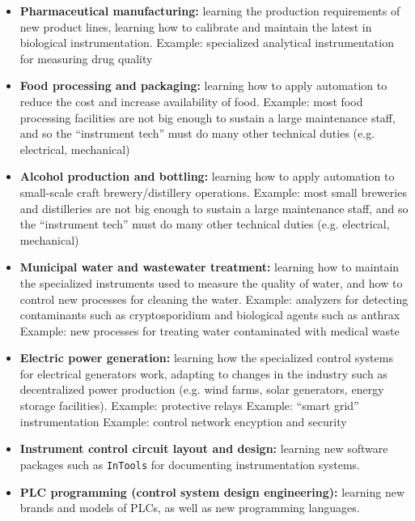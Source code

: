 \begin{itemize}
\itemitem{} Example: pulp consistency control, which is unique to this industry
\itemitem{} Example: ``hog fuel'' boiler controls, challenging due to the inconsist nature of wood waste (``hog'') fuel
\itemitem{} Example: recovery boiler operations (very dangerous processes, known for their history of explosive failure)
\item{} {\bf Pharmaceutical manufacturing:} learning the production requirements of new product lines, learning how to calibrate and maintain the latest in biological instrumentation.  
\itemitem{} Example: specialized analytical instrumentation for measuring drug quality
\item{} {\bf Food processing and packaging:} learning how to apply automation to reduce the cost and increase availability of food.
\itemitem{} Example: most food processing facilities are not big enough to sustain a large maintenance staff, and so the ``instrument tech'' must do many other technical duties (e.g. electrical, mechanical)
\item{} {\bf Alcohol production and bottling:} learning how to apply automation to small-scale craft brewery/distillery operations.
\itemitem{} Example: most small breweries and distilleries are not big enough to sustain a large maintenance staff, and so the ``instrument tech'' must do many other technical duties (e.g. electrical, mechanical)
\item{} {\bf Municipal water and wastewater treatment:} learning how to maintain the specialized instruments used to measure the quality of water, and how to control new processes for cleaning the water.
\itemitem{} Example: analyzers for detecting contaminants such as cryptosporidium and biological agents such as anthrax
\itemitem{} Example: new processes for treating water contaminated with medical waste
\item{} {\bf Electric power generation:} learning how the specialized control systems for electrical generators work, adapting to changes in the industry such as decentralized power production (e.g. wind farms, solar generators, energy storage facilities).
\itemitem{} Example: protective relays
\itemitem{} Example: ``smart grid'' instrumentation
\itemitem{} Example: control network encyption and security
\item{} {\bf Instrument control circuit layout and design:} learning new software packages such as {\tt InTools} for documenting instrumentation systems.
\item{} {\bf PLC programming (control system design engineering):} learning new brands and models of PLCs, as well as new programming languages.

\end{itemize}
